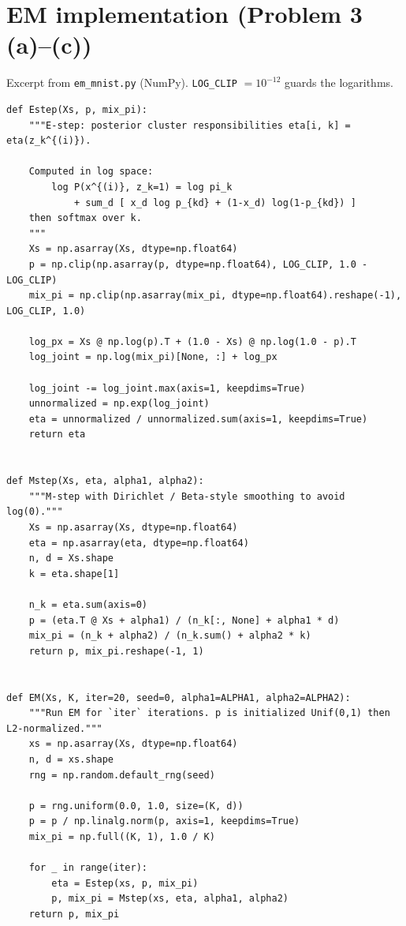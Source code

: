 \documentclass[11pt]{article}
\begin{document}
\appendix
\section{EM implementation (Problem 3 (a)--(c))}\label{app:em}

Excerpt from \texttt{em\_mnist.py} (NumPy). \texttt{LOG\_CLIP} \(=10^{-12}\) guards the logarithms.

{\small
\begin{verbatim}
def Estep(Xs, p, mix_pi):
    """E-step: posterior cluster responsibilities eta[i, k] = eta(z_k^{(i)}).

    Computed in log space:
        log P(x^{(i)}, z_k=1) = log pi_k
            + sum_d [ x_d log p_{kd} + (1-x_d) log(1-p_{kd}) ]
    then softmax over k.
    """
    Xs = np.asarray(Xs, dtype=np.float64)
    p = np.clip(np.asarray(p, dtype=np.float64), LOG_CLIP, 1.0 - LOG_CLIP)
    mix_pi = np.clip(np.asarray(mix_pi, dtype=np.float64).reshape(-1), LOG_CLIP, 1.0)

    log_px = Xs @ np.log(p).T + (1.0 - Xs) @ np.log(1.0 - p).T
    log_joint = np.log(mix_pi)[None, :] + log_px

    log_joint -= log_joint.max(axis=1, keepdims=True)
    unnormalized = np.exp(log_joint)
    eta = unnormalized / unnormalized.sum(axis=1, keepdims=True)
    return eta


def Mstep(Xs, eta, alpha1, alpha2):
    """M-step with Dirichlet / Beta-style smoothing to avoid log(0)."""
    Xs = np.asarray(Xs, dtype=np.float64)
    eta = np.asarray(eta, dtype=np.float64)
    n, d = Xs.shape
    k = eta.shape[1]

    n_k = eta.sum(axis=0)
    p = (eta.T @ Xs + alpha1) / (n_k[:, None] + alpha1 * d)
    mix_pi = (n_k + alpha2) / (n_k.sum() + alpha2 * k)
    return p, mix_pi.reshape(-1, 1)


def EM(Xs, K, iter=20, seed=0, alpha1=ALPHA1, alpha2=ALPHA2):
    """Run EM for `iter` iterations. p is initialized Unif(0,1) then L2-normalized."""
    xs = np.asarray(Xs, dtype=np.float64)
    n, d = xs.shape
    rng = np.random.default_rng(seed)

    p = rng.uniform(0.0, 1.0, size=(K, d))
    p = p / np.linalg.norm(p, axis=1, keepdims=True)
    mix_pi = np.full((K, 1), 1.0 / K)

    for _ in range(iter):
        eta = Estep(xs, p, mix_pi)
        p, mix_pi = Mstep(xs, eta, alpha1, alpha2)
    return p, mix_pi
\end{verbatim}
}
\end{document}
